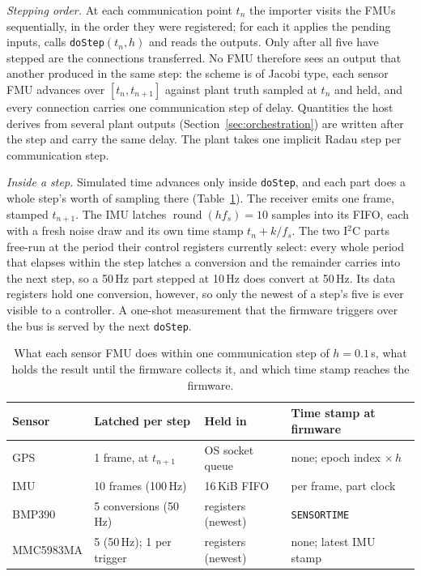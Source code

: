\documentclass[preprint,12pt,a4paper]{elsarticle}
\newcommand{\code}[1]{\texttt{\small #1}}
\begin{document}
\emph{Stepping order.} At each communication point $t_n$ the importer visits the
FMUs sequentially, in the order they were registered; for each it applies the
pending inputs, calls \code{doStep}$(t_n,h)$ and reads the outputs. Only after
all five have stepped are the connections transferred. No FMU therefore sees an
output that another produced in the same step: the scheme is of Jacobi type,
each sensor FMU advances over $[t_n,t_{n+1}]$ against plant truth sampled at
$t_n$ and held, and every connection carries one communication step of delay.
Quantities the host derives from several plant outputs
(Section~\ref{sec:orchestration}) are written after the step and carry the same
delay. The plant takes one implicit Radau step per communication step.

\emph{Inside a step.} Simulated time advances only inside \code{doStep}, and
each part does a whole step's worth of sampling there
(Table~\ref{tab:sync}). The receiver emits one frame, stamped $t_{n+1}$. The
IMU latches $\operatorname{round}(h f_s)=10$ samples into its FIFO, each with a
fresh noise draw and its own time stamp $t_n+k/f_s$. The two I$^2$C parts
free-run at the period their control registers currently select: every whole
period that elapses within the step latches a conversion and the remainder
carries into the next step, so a 50\,Hz part stepped at 10\,Hz does convert at
50\,Hz. Its data registers hold one conversion, however, so only the newest of
a step's five is ever visible to a controller. A one-shot measurement that the
firmware triggers over the bus is served by the next \code{doStep}.

\begin{table}[tbp]
\centering
\caption{What each sensor FMU does within one communication step of
$h=0.1$\,s, what holds the result until the firmware collects it, and which
time stamp reaches the firmware.}
\label{tab:sync}
\footnotesize
\setlength{\tabcolsep}{4pt}
\begin{tabular}{@{}llll@{}}
\toprule
Sensor & Latched per step & Held in & Time stamp at firmware\\
\midrule
GPS       & 1 frame, at $t_{n+1}$     & OS socket queue   & none; epoch index $\times\,h$\\
IMU       & 10 frames (100\,Hz)       & 16\,KiB FIFO      & per frame, part clock\\
BMP390    & 5 conversions (50\,Hz)    & registers (newest) & \code{SENSORTIME}\\
MMC5983MA & 5 (50\,Hz); 1 per trigger & registers (newest) & none; latest IMU stamp\\
\bottomrule
\end{tabular}
\end{table}
\end{document}
